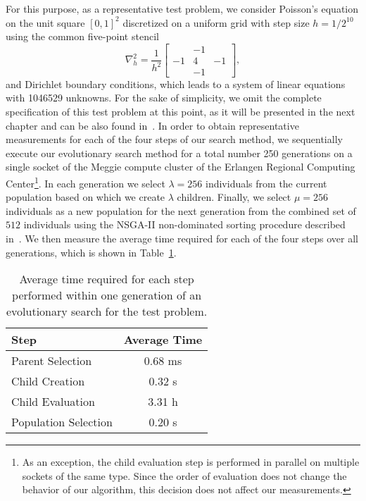 For this purpose, as a representative test problem, we consider Poisson's equation on the unit square $\left[0,1\right]^2$ discretized on a uniform grid with step size $h = 1/2^{10}$ using the common five-point stencil
\begin{equation*}
	\nabla^2_h = 
	\frac{1}{h^2} \begin{bmatrix}
		& -1 & \\
		-1 & 4 & -1 \\
		& -1 &  
	\end{bmatrix},
\end{equation*}
and Dirichlet boundary conditions, which leads to a system of linear equations with 1046529 unknowns.
For the sake of simplicity, we omit the complete specification of this test problem at this point, as it will be presented in the next chapter and can be also found in~\cite{schmitt2021evostencils}.
In order to obtain representative measurements for each of the four steps of our search method, we sequentially execute our evolutionary search method for a total number 250 generations on a single socket of the Meggie compute cluster of the Erlangen Regional Computing Center\footnote{As an exception, the child evaluation step is performed in parallel on multiple sockets of the same type. Since the order of evaluation does not change the behavior of our algorithm, this decision does not affect our measurements.}.
In each generation we select $\lambda = 256$ individuals from the current population based on which we create $\lambda$ children.
Finally, we select $\mu = 256$ individuals as a new population for the next generation from the combined set of $512$ individuals using the NSGA-II non-dominated sorting procedure described in~\cite{deb2002fast}.
We then measure the average time required for each of the four steps over all generations, which is shown in Table~\ref{table:evolutionary-search-profiling}.
\begin{table}
	\caption{Average time required for each step performed within one generation of an evolutionary search for the test problem.}
	\label{table:evolutionary-search-profiling}
	\centering
	\begin{tabular}{l c}
		\toprule
		Step & Average Time \\
		\midrule
		Parent Selection & 0.68 ms \\
		\midrule
		Child Creation  & 0.32 s \\
		\midrule
		Child Evaluation  & 3.31 h \\
		\midrule
		Population Selection  & 0.20 s \\
		\bottomrule
	\end{tabular}
\end{table}
